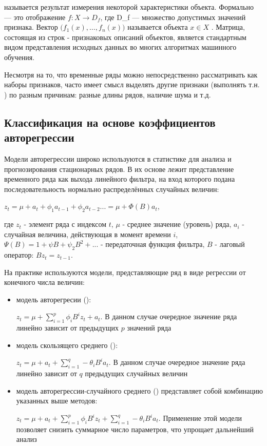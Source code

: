  называется результат измерения некоторой характеристики объекта. Формально  — это отображение $f: X\to D_f $, где D\_f — множество допустимых значений признака. Вектор $\bigl( f_1(x),\ldots,f_n(x) \bigr)$ называется  объекта $x \in X$ \cite{features_def}. Матрица, состоящая из строк - признаковых описаний объектов, является стандартным видом представления исходных данных во многих алгоритмах машинного обучения. 

Несмотря на то, что временные ряды можно непосредственно рассматривать как наборы признаков, часто имеет смысл выделять другие признаки (выполнять т.н. ) по разным причинам: разные длины рядов, наличие шума и т.д.


\subsection{Классификация на основе коэффициентов авторегрессии}

Модели авторегрессии широко используются в статистике для анализа и прогнозирования стационарных рядов. В их основе лежит представление временного ряда как выхода линейного фильтра, на вход которого подана последовательность нормально распределённых случайных величин:

$z_t=\mu+a_t+\phi_1a_{t-1}+\phi_2a_{t-2}...=\mu+\Phi(B)a_t$, 

где $z_t$ - элемент ряда с индексом $t$, $\mu$ - среднее значение (уровень) ряда, $a_i$ - случайная величина, действующая в момент времени $i$, $\Psi(B)=1+\psi B+\psi_2 B^2+...$ - передаточная функция фильтра, $B$ - лаговый оператор: $Bz_t=z_{t-1}$.

На практике используются модели, представляющие ряд в виде регрессии от конечного числа величин\cite{bj_ts}: 

\begin{itemize}
\item модель авторегресии (): 

$z_t=\mu+\sum_{i=1}^p \phi_iB^i z_t + a_t$. В данном случае очередное значение ряда линейно зависит от предыдущих $p$ значений ряда
\item модель скользящего среднего ():

$z_t=\mu + a_t + \sum_{i=1}^q -\theta_iB^i a_t $. В данном случае очередное значение ряда линейно зависит от $q$ предыдущих случайных величин
\item модель авторегрессии-случайного среднего () представляет собой комбинацию указанных выше методов:

$z_t=\mu + a_t + \sum_{i=1}^p \phi_iB^i z_t + \sum_{i=1}^q -\theta_iB^i a_t $. Применение этой модели позволяет снизить суммарное число параметров, что упрощает дальнейший анализ
\end{itemize}

